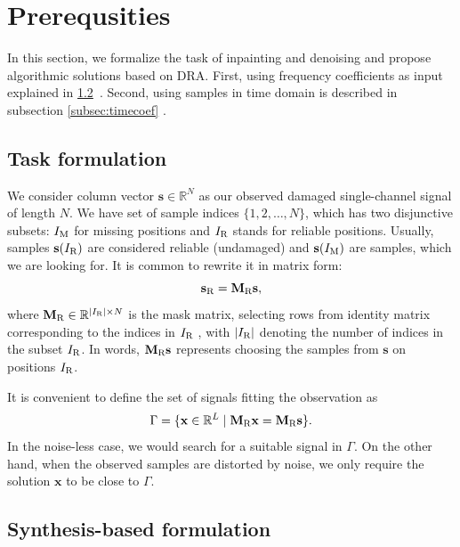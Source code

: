 \documentclass[conference]{IEEEtran}
\begin{document}
\section{Prerequsities}\label{sec:prereq} 


In this section, we formalize the task of inpainting and denoising and propose algorithmic solutions based on DRA.
First, using frequency coefficients as input explained in \ref{subsec:freqcoef}~\cite{Mokry2020}.
Second, using samples in time domain is described in subsection \ref{subsec:timecoef} \cite{Mokry2021}.


\subsection{Task formulation}

We consider column vector $ \mathbf{s} \in \mathbb{R}^{N} $ as our observed damaged single-channel signal of length $ N $.
We have set %
of sample indices $ \{1,2,\dots,N\} $, which has two disjunctive subsets: $I_\textup{M} $ for missing positions and $ I_\textup{R} $ stands for reliable positions.
Usually, samples $ \mathbf{s}(I_\textup{R}) $ are considered reliable (undamaged) and $ \mathbf{s}(I_\textup{M}) $ are samples, which we are looking for.
It is common to rewrite it in matrix form:
\begin{equation*}
	\mathbf{s}_{\textup{R}} = \mathbf{M}_{\textup{R}}\mathbf{s},
\end{equation*}
where $\mathbf{M}_\textup{R} \in \mathbb{R} ^ { |I_\textup{R}| \times N}$ is the mask matrix, selecting rows from identity matrix corresponding to the indices in $I_\textup{R}$ \cite{Adler2012}, with $ |I_\textup{R}|$ denoting the number of indices in the subset $I_\textup{R}$.
In words, $\mathbf{M}_{\textup{R}}\mathbf{s}$ represents choosing the samples from $\mathbf{s}$ on positions $I_\textup{R}$.

It is convenient to define the set of signals fitting the observation as
\begin{equation}
	\label{eq:Gamma}
	\Gamma = \lbrace \mathbf{x}\in \mathbb {R}^L\mid \mathbf{M}_{\textup{R}}\mathbf{x}=\mathbf{M}_{\textup{R}}\mathbf {s}\rbrace.
\end{equation}
In the noise-less case, we would search for a suitable signal in $\Gamma$.
On the other hand, when the observed samples are distorted by noise, we only require the solution $\mathbf{x}$ to be close to $\Gamma$.

\subsection{Synthesis-based formulation}\label{subsec:freqcoef}
\end{document}
